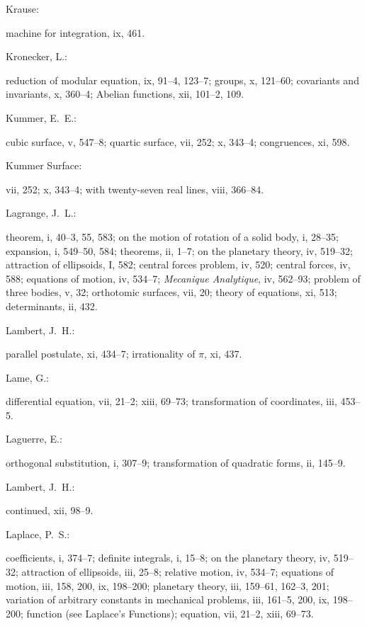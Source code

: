 \documentclass[11pt,a4paper]{book}
\providecommand{\V}[1]{#1}
\providecommand{\IndexEntry}[2]{#1\dotfill #2\par}
\begin{document}
\IndexEntry{Krause}: machine for integration, \V{ix}, 461.

\IndexEntry{Kronecker, L.}: reduction of modular equation, \V{ix}, 91--4, 123--7; groups, \V{x}, 121--60; covariants and invariants, \V{x}, 360--4; Abelian functions, \V{xii}, 101--2, 109.

\IndexEntry{Kummer, E.\ E.}: cubic surface, \V{v}, 547--8; quartic surface, \V{vii}, 252; \V{x}, 343--4; congruences, \V{xi}, 598.

\IndexEntry{Kummer Surface}: \V{vii}, 252; \V{x}, 343--4; with twenty-seven real lines, \V{viii}, 366--84.

\IndexEntry{Lagrange, J.\ L.}: theorem, \V{i}, 40--3, 55, 583; on the motion of rotation of a solid body, \V{i}, 28--35; expansion, \V{i}, 549--50, 584; theorems, \V{ii}, 1--7; on the planetary theory, \V{iv}, 519--32; attraction of ellipsoids, \V{I}, 582; central forces problem, \V{iv}, 520; central forces, \V{iv}, 588; equations of motion, \V{iv}, 534--7; \textit{Mecanique Analytique}, \V{iv}, 562--93; problem of three bodies, \V{v}, 32; orthotomic surfaces, \V{vii}, 20; theory of equations, \V{xi}, 513; determinants, \V{ii}, 432.

\IndexEntry{Lambert, J.\ H.}: parallel postulate, \V{xi}, 434--7; irrationality of $\pi$, \V{xi}, 437.

\IndexEntry{Lame, G.}: differential equation, \V{vii}, 21--2; \V{xiii}, 69--73; transformation of coordinates, \V{iii}, 453--5.

\newpage

\setcounter{page}{108}

\IndexEntry{Laguerre, E.}: orthogonal substitution, \V{i}, 307--9; transformation of quadratic forms, \V{ii}, 145--9.

\IndexEntry{Lambert, J.\ H.}: continued, \V{xii}, 98--9.

\IndexEntry{Laplace, P.\ S.}: coefficients, \V{i}, 374--7; definite integrals, \V{i}, 15--8; on the planetary theory, \V{iv}, 519--32; attraction of ellipsoids, \V{iii}, 25--8; relative motion, \V{iv}, 534--7; equations of motion, \V{iii}, 158, 200, \V{ix}, 198--200; planetary theory, \V{iii}, 159--61, 162--3, 201; variation of arbitrary constants in mechanical problems, \V{iii}, 161--5, 200, \V{ix}, 198--200; function (see Laplace's Functions); equation, \V{vii}, 21--2, \V{xiii}, 69--73.
\end{document}

